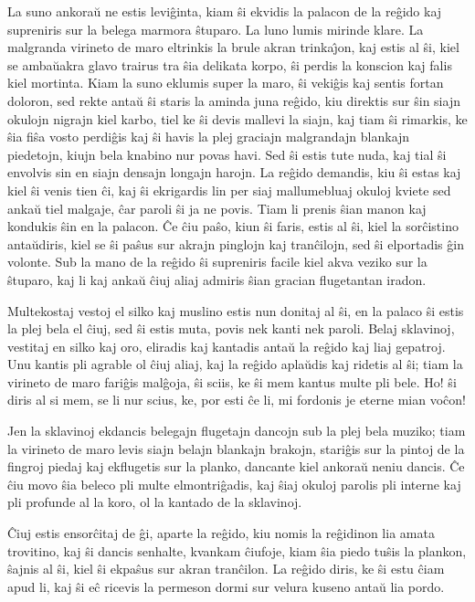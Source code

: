    La suno ankora\u u ne estis levi\^ginta, kiam \^si ekvidis la palacon de
la re\^gido kaj supreniris sur la belega marmora \^stuparo. La luno
lumis mirinde klare. La malgranda virineto de maro eltrinkis la
brule akran trinka\^{\j}on, kaj estis al \^si, kiel se amba\u uakra
glavo trairus tra \^sia delikata korpo, \^si perdis la konscion kaj
falis kiel mortinta. Kiam la suno eklumis super la maro, \^si
veki\^gis kaj sentis fortan doloron, sed rekte anta\u u \^si staris
la aminda juna re\^gido, kiu direktis sur \^sin siajn okulojn
nigrajn kiel karbo, tiel ke \^si devis mallevi la siajn, kaj tiam
\^si rimarkis, ke \^sia fi\^sa vosto perdi\^gis kaj \^si havis la
plej graciajn malgrandajn blankajn piedetojn, kiujn bela knabino nur
povas havi. Sed \^si estis tute nuda, kaj tial \^si envolvis sin en
siajn densajn longajn harojn. La re\^gido demandis, kiu \^si estas
kaj kiel \^si venis tien \^ci, kaj \^si ekrigardis lin per siaj
mallumebluaj okuloj kviete sed anka\u u tiel malgaje, \^car paroli
\^si ja ne povis. Tiam li prenis \^sian manon kaj kondukis \^sin en
la palacon. \^Ce \^ciu pa\^so, kiun \^si faris, estis al \^si, kiel
la sor\^cistino anta\u udiris, kiel se \^si pa\^sus sur akrajn
pinglojn kaj tran\^cilojn, sed \^si elportadis \^gin volonte. Sub la
mano de la re\^gido \^si supreniris facile kiel akva veziko sur la
\^stuparo, kaj li kaj anka\u u \^ciuj aliaj admiris \^sian gracian
flugetantan iradon.

   Multekostaj vestoj el silko kaj muslino estis nun donitaj al \^si, en
la palaco \^si estis la plej bela el \^ciuj, sed \^si estis muta,
povis nek kanti nek paroli. Belaj sklavinoj, vestitaj en silko kaj
oro, eliradis kaj kantadis anta\u u la re\^gido kaj liaj gepatroj.
Unu kantis pli agrable ol \^ciuj aliaj, kaj la re\^gido apla\u udis
kaj ridetis al \^si; tiam la virineto de maro fari\^gis mal\^goja,
\^si sciis, ke \^si mem kantus multe pli bele. Ho! \^si diris al si
mem, se li nur scius, ke, por esti \^ce li, mi fordonis je eterne
mian vo\^con!

   Jen la sklavinoj ekdancis belegajn flugetajn dancojn sub la plej bela
muziko; tiam la virineto de maro levis siajn belajn blankajn
brakojn, stari\^gis sur la pintoj de la fingroj piedaj kaj
ekflugetis sur la planko, dancante kiel ankora\u u neniu dancis.
\^Ce \^ciu movo \^sia beleco pli multe elmontri\^gadis, kaj \^siaj
okuloj parolis pli interne kaj pli profunde al la koro, ol la
kantado de la sklavinoj.

   \^Ciuj estis ensor\^citaj de \^gi, aparte la re\^gido, kiu nomis la
re\^gidinon lia amata trovitino, kaj \^si dancis senhalte, kvankam
\^ciufoje, kiam \^sia piedo tu\^sis la plankon, \^sajnis al \^si,
kiel \^si ekpa\^sus sur akran tran\^cilon. La re\^gido diris, ke
\^si estu \^ciam apud li, kaj \^si e\^c ricevis la permeson dormi
sur velura kuseno anta\u u lia pordo.

